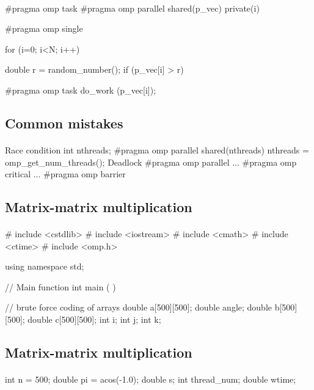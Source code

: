 \documentclass[%
twoside,                 %
final,                   %
10pt]{article}
\begin{document}
\paragraph{}
\bcppcod
#pragma omp task 
#pragma omp parallel shared(p_vec) private(i)
{
#pragma omp single
{
for (i=0; i<N; i++) {
double r = random_number();
if (p_vec[i] > r) {
#pragma omp task
do_work (p_vec[i]);
\ecppcod




\subsection{Common mistakes}

\paragraph{}
Race condition
\bcppcod
int nthreads;
#pragma omp parallel shared(nthreads)
{
nthreads = omp_get_num_threads();
}
\ecppcod
Deadlock
\bcppcod
#pragma omp parallel
{
...
#pragma omp critical
{
...
#pragma omp barrier
}
}
\ecppcod




\subsection{Matrix-matrix multiplication}

\paragraph{}
\bcppcod
# include <cstdlib>
# include <iostream>
# include <cmath>
# include <ctime>
# include <omp.h>

using namespace std;

// Main function
int main ( )
{
// brute force coding of arrays
  double a[500][500];
  double angle;
  double b[500][500];
  double c[500][500];
  int i;
  int j;
  int k;
\ecppcod




\subsection{Matrix-matrix multiplication}

\paragraph{}
\bcppcod
  int n = 500;
  double pi = acos(-1.0);
  double s;
  int thread_num;
  double wtime;

}}}}}
\end{document}
